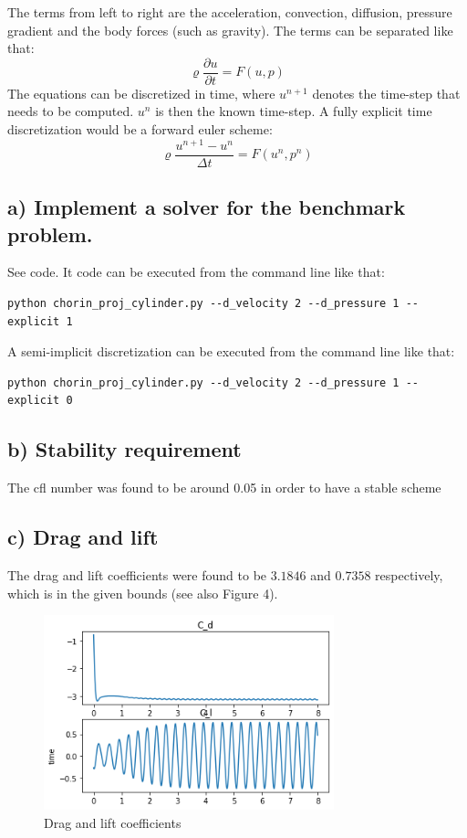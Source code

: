 \documentclass{article}
\begin{document}
The terms from left to right are the acceleration, convection, diffusion, pressure gradient and the body forces (such as gravity). The terms can be separated like that:
$$\varrho \frac{ \partial  u}{\partial t} = F(u, p) $$
The equations can be discretized in time, where $u^{n+1}$ denotes the time-step that needs to be computed. $u^{n}$ is then the known time-step. A fully explicit time discretization would be a forward euler scheme:
$$\varrho \frac{u^{n+1} - u^{n}}{\Delta t} = F(u^{n}, p^{n}) $$


\subsection*{a) Implement a solver for the benchmark problem.}
See code. It code can be executed from the command line like that:
\begin{verbatim}
python chorin_proj_cylinder.py --d_velocity 2 --d_pressure 1 --explicit 1
\end{verbatim}



A semi-implicit discretization can be executed from the command line like that:
\begin{verbatim}
python chorin_proj_cylinder.py --d_velocity 2 --d_pressure 1 --explicit 0
\end{verbatim}


\subsection*{b) Stability requirement}
The cfl number was found to be around 0.05 in order to have a stable scheme

\subsection*{c) Drag and lift}

The drag and lift coefficients were found to be $3.1846$ and $0.7358$ respectively, which is in the given bounds (see also Figure 4).


\begin{figure}[h]
    \centering
    \includegraphics[width=0.75\textwidth]{draglift.png}
    \caption{Drag and lift coefficients}
    \label{fig:mesh1}
\end{figure}




\end{document}
